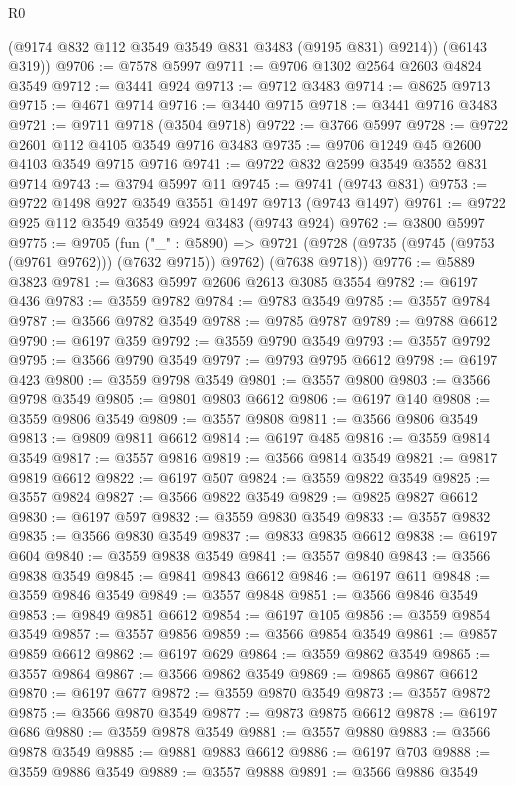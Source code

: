 \begin{lexlean}{R0}
\begin{coremodule}
        (@9174 @832 @112 @3549 @3549 @831 @3483 (@9195 @831) @9214))
      (@6143 @319))
@9706 := @7578 @5997
@9711 := @9706 @1302 @2564 @2603 @4824 @3549
@9712 := @3441 @924
@9713 := @9712 @3483
@9714 := @8625 @9713
@9715 := @4671 @9714
@9716 := @3440 @9715
@9718 := @3441 @9716 @3483
@9721 := @9711 @9718 (@3504 @9718)
@9722 := @3766 @5997
@9728 := @9722 @2601 @112 @4105 @3549 @9716 @3483
@9735 := @9706 @1249 @45 @2600 @4103 @3549 @9715 @9716
@9741 := @9722 @832 @2599 @3549 @3552 @831 @9714
@9743 := @3794 @5997 @11
@9745 := @9741 (@9743 @831)
@9753 := @9722 @1498 @927 @3549 @3551 @1497 @9713 (@9743 @1497)
@9761 := @9722 @925 @112 @3549 @3549 @924 @3483 (@9743 @924)
@9762 := @3800 @5997
@9775 := @9705
    (fun ("_" : @5890) =>
    @9721 (@9728 (@9735 (@9745 (@9753 (@9761 @9762))) (@7632 @9715)) @9762) (@7638 @9718))
@9776 := @5889 @3823
@9781 := @3683 @5997 @2606 @2613 @3085 @3554
@9782 := @6197 @436
@9783 := @3559 @9782
@9784 := @9783 @3549
@9785 := @3557 @9784
@9787 := @3566 @9782 @3549
@9788 := @9785 @9787
@9789 := @9788 @6612
@9790 := @6197 @359
@9792 := @3559 @9790 @3549
@9793 := @3557 @9792
@9795 := @3566 @9790 @3549
@9797 := @9793 @9795 @6612
@9798 := @6197 @423
@9800 := @3559 @9798 @3549
@9801 := @3557 @9800
@9803 := @3566 @9798 @3549
@9805 := @9801 @9803 @6612
@9806 := @6197 @140
@9808 := @3559 @9806 @3549
@9809 := @3557 @9808
@9811 := @3566 @9806 @3549
@9813 := @9809 @9811 @6612
@9814 := @6197 @485
@9816 := @3559 @9814 @3549
@9817 := @3557 @9816
@9819 := @3566 @9814 @3549
@9821 := @9817 @9819 @6612
@9822 := @6197 @507
@9824 := @3559 @9822 @3549
@9825 := @3557 @9824
@9827 := @3566 @9822 @3549
@9829 := @9825 @9827 @6612
@9830 := @6197 @597
@9832 := @3559 @9830 @3549
@9833 := @3557 @9832
@9835 := @3566 @9830 @3549
@9837 := @9833 @9835 @6612
@9838 := @6197 @604
@9840 := @3559 @9838 @3549
@9841 := @3557 @9840
@9843 := @3566 @9838 @3549
@9845 := @9841 @9843 @6612
@9846 := @6197 @611
@9848 := @3559 @9846 @3549
@9849 := @3557 @9848
@9851 := @3566 @9846 @3549
@9853 := @9849 @9851 @6612
@9854 := @6197 @105
@9856 := @3559 @9854 @3549
@9857 := @3557 @9856
@9859 := @3566 @9854 @3549
@9861 := @9857 @9859 @6612
@9862 := @6197 @629
@9864 := @3559 @9862 @3549
@9865 := @3557 @9864
@9867 := @3566 @9862 @3549
@9869 := @9865 @9867 @6612
@9870 := @6197 @677
@9872 := @3559 @9870 @3549
@9873 := @3557 @9872
@9875 := @3566 @9870 @3549
@9877 := @9873 @9875 @6612
@9878 := @6197 @686
@9880 := @3559 @9878 @3549
@9881 := @3557 @9880
@9883 := @3566 @9878 @3549
@9885 := @9881 @9883 @6612
@9886 := @6197 @703
@9888 := @3559 @9886 @3549
@9889 := @3557 @9888
@9891 := @3566 @9886 @3549

\end{coremodule}
\end{lexlean}
